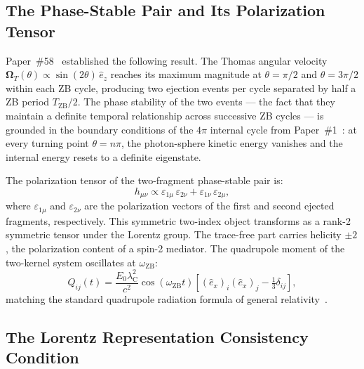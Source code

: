 \documentclass[%
 reprint, amsmath,amssymb, aps, prd, ]{revtex4-2}
\numberwithin{equation}{section}
\newcommand{\iphase}{\theta}
\newcommand{\omZB}{\omega_{\text{ZB}}}
\newcommand{\lambdaC}{\lambda_{\mathrm{C}}}
\newcommand{\OmT}{\boldsymbol{\Omega}_T}
\newcommand{\ehat}[1]{\hat{e}_{#1}}
\begin{document}
\subsection{The Phase-Stable Pair and Its Polarization Tensor}

Paper~\#58~\cite{hanamura58} established the following result.
The Thomas angular velocity~\cite{Thomas1927} $\OmT(\iphase) \propto \sin(2\iphase)\,\ehat{z}$ reaches its maximum magnitude at $\iphase = \pi/2$ and $\iphase = 3\pi/2$ within each ZB cycle, producing two ejection events per cycle separated by half a ZB period $T_\mathrm{ZB}/2$.
The phase stability of the two events --- the fact that they maintain a definite temporal relationship across successive ZB cycles --- is grounded in the boundary conditions of the $4\pi$ internal cycle from Paper~\#1~\cite{hanamura01}: at every turning point $\iphase = n\pi$, the photon-sphere kinetic energy vanishes and the internal energy resets to a definite eigenstate.

The polarization tensor of the two-fragment phase-stable pair is:
\begin{equation}
h_{\mu\nu} \propto \varepsilon_{1\mu}\,\varepsilon_{2\nu} + \varepsilon_{1\nu}\,\varepsilon_{2\mu},
\label{eq:rank2}
\end{equation}
where $\varepsilon_{1\mu}$ and $\varepsilon_{2\nu}$ are the polarization vectors of the first and second ejected fragments, respectively.
This symmetric two-index object transforms as a rank-2 symmetric tensor under the Lorentz group.
The trace-free part carries helicity $\pm 2$, the polarization content of a spin-2 mediator.
The quadrupole moment of the two-kernel system oscillates at $\omZB$:
\begin{equation}
Q_{ij}(t) = \frac{E_0\lambdaC^2}{c^2}\cos(\omZB t)\left[(\ehat{x})_i(\ehat{x})_j - \tfrac{1}{3}\delta_{ij}\right],
\label{eq:quadrupole}
\end{equation}
matching the standard quadrupole radiation formula of general relativity~\cite{Maggiore2007}.

\subsection{The Lorentz Representation Consistency Condition}
\end{document}
